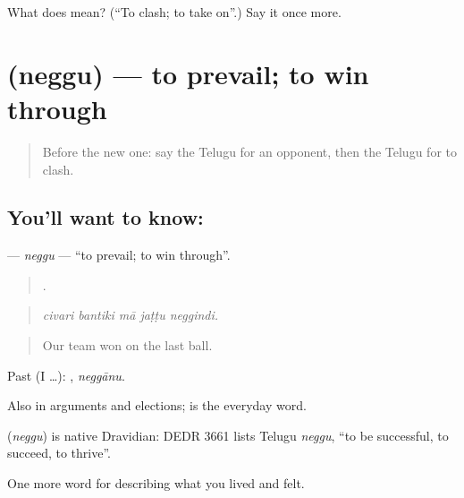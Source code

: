 \begin{tcolorbox}[breakable,colback=teal!4,colframe=teal!35!black,title={Before you move on}]
What does  mean? (\textquotedblleft{}To clash; to take on\textquotedblright{}.) Say it once more.
\end{tcolorbox}
\section[\texorpdfstring{\te{నెగ్గు} (neggu)}{నెగ్గు (neggu)}]{ (neggu) — to prevail; to win through}

\label{lesson:TE-C544-neggu}



\begin{quote}
Before the new one: say the Telugu for an opponent, then the Telugu for to clash.
\end{quote}

\subsection*{You'll want to know: }
\textbf{} — \emph{neggu} — \textquotedblleft{}to prevail; to win through\textquotedblright{}.

\begin{quote}
    .
\end{quote}

\begin{quote}
\emph{civari bantiki mā jaṭṭu neggindi.}
\end{quote}

\begin{quote}
Our team won on the last ball.
\end{quote}

Past (I …): , \emph{neggānu}.

Also in arguments and elections;  is the everyday word.

\begin{cousinweb}
\textbf{} (\emph{neggu}) is native Dravidian: DEDR 3661 lists Telugu \emph{neggu}, \textquotedblleft{}to be successful, to succeed, to thrive\textquotedblright{}.
\end{cousinweb}

\begin{grammarlens}[title={What you've built}]
One more word for describing what you lived and felt.
\end{grammarlens}

